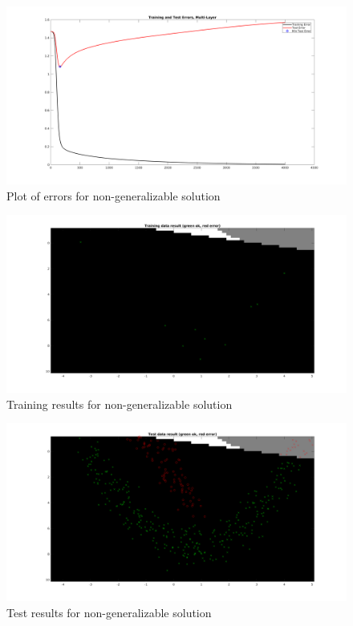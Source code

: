 \documentclass{article}
\begin{document}
\begin{figure}
    \includegraphics[width=13cm]{errornongen.png}
    \caption{Plot of errors for non-generalizable solution}
    \label{fig:errornongen}
\end{figure}

\begin{figure}
    \includegraphics[width=13cm]{trainingresnongen.png}
    \caption{Training results for non-generalizable solution}
    \label{fig:trainnongen}
\end{figure}

\begin{figure}
    \includegraphics[width=13cm]{testresnongen.png}
    \caption{Test results for non-generalizable solution}
    \label{fig:testnongen}
\end{figure}
\end{document}

